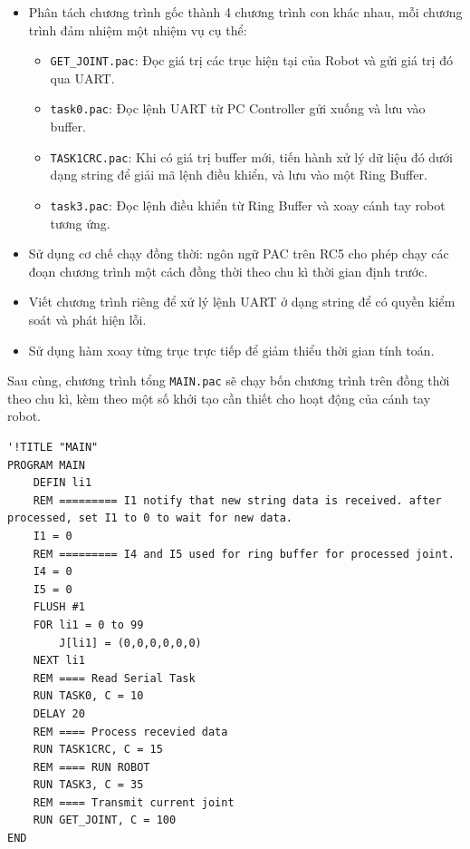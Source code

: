\begin{itemize}
    \item Phân tách chương trình gốc thành 4 chương trình con khác nhau, mỗi chương trình đảm nhiệm một nhiệm vụ cụ thể:
    \begin{itemize}
        \item \lstinline[style=inlinecode]{GET_JOINT.pac}: Đọc giá trị các trục hiện tại của Robot và gửi giá trị đó qua UART.
        \item \lstinline[style=inlinecode]{task0.pac}: Đọc lệnh UART từ PC Controller gửi xuống và lưu vào buffer.
        \item \lstinline[style=inlinecode]{TASK1CRC.pac}: Khi có giá trị buffer mới, tiến hành xử lý dữ liệu đó dưới dạng string để giải mã lệnh điều khiển, và lưu vào một Ring Buffer.
        \item \lstinline[style=inlinecode]{task3.pac}: Đọc lệnh điều khiển từ Ring Buffer và xoay cánh tay robot tương ứng.
    \end{itemize}
    \item Sử dụng cơ chế chạy đồng thời: ngôn ngữ PAC trên RC5 cho phép chạy các đoạn chương trình một cách đồng thời theo chu kì thời gian định trước. 
    \item Viết chương trình riêng để xử lý lệnh UART ở dạng string để có quyền kiểm soát và phát hiện lỗi.
    \item Sử dụng hàm xoay từng trục trực tiếp để giảm thiểu thời gian tính toán.
\end{itemize}



Sau cùng, chương trình tổng \lstinline[style=inlinecode]{MAIN.pac} sẽ chạy bốn chương trình trên đồng thời theo chu kì, kèm theo một số khởi tạo cần thiết cho hoạt động của cánh tay robot.

\begin{lstlisting}
'!TITLE "MAIN"
PROGRAM MAIN
    DEFIN li1
    REM ========= I1 notify that new string data is received. after processed, set I1 to 0 to wait for new data.
    I1 = 0
    REM ========= I4 and I5 used for ring buffer for processed joint.
    I4 = 0
    I5 = 0
    FLUSH #1
    FOR li1 = 0 to 99
        J[li1] = (0,0,0,0,0,0)
    NEXT li1
    REM ==== Read Serial Task
    RUN TASK0, C = 10
    DELAY 20
    REM ==== Process recevied data
    RUN TASK1CRC, C = 15
    REM ==== RUN ROBOT
    RUN TASK3, C = 35
    REM ==== Transmit current joint
    RUN GET_JOINT, C = 100
END
\end{lstlisting}

